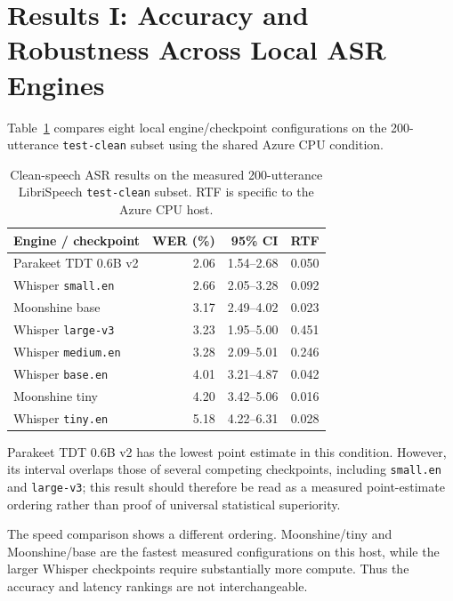 \section{Results I: Accuracy and Robustness Across Local ASR Engines}

Table~\ref{tab:clean-asr} compares eight local engine/checkpoint configurations on the
200-utterance \texttt{test-clean} subset using the shared Azure CPU condition.

\begin{table}[ht]
\centering
\caption{Clean-speech ASR results on the measured 200-utterance LibriSpeech
\texttt{test-clean} subset. RTF is specific to the Azure CPU host.}
\label{tab:clean-asr}
\begin{tabular}{lrrr}
\toprule
Engine / checkpoint & WER (\%) & 95\% CI & RTF \\
\midrule
Parakeet TDT 0.6B v2 & 2.06 & 1.54--2.68 & 0.050 \\
Whisper \texttt{small.en} & 2.66 & 2.05--3.28 & 0.092 \\
Moonshine base & 3.17 & 2.49--4.02 & 0.023 \\
Whisper \texttt{large-v3} & 3.23 & 1.95--5.00 & 0.451 \\
Whisper \texttt{medium.en} & 3.28 & 2.09--5.01 & 0.246 \\
Whisper \texttt{base.en} & 4.01 & 3.21--4.87 & 0.042 \\
Moonshine tiny & 4.20 & 3.42--5.06 & 0.016 \\
Whisper \texttt{tiny.en} & 5.18 & 4.22--6.31 & 0.028 \\
\bottomrule
\end{tabular}
\end{table}

Parakeet TDT 0.6B v2 has the lowest \wer{} point estimate in this condition. However, its
interval overlaps those of several competing checkpoints, including \texttt{small.en} and
\texttt{large-v3}; this result should therefore be read as a measured point-estimate ordering
rather than proof of universal statistical superiority.

The speed comparison shows a different ordering. Moonshine/tiny and Moonshine/base are the
fastest measured configurations on this host, while the larger Whisper checkpoints require
substantially more compute. Thus the accuracy and latency rankings are not interchangeable.

